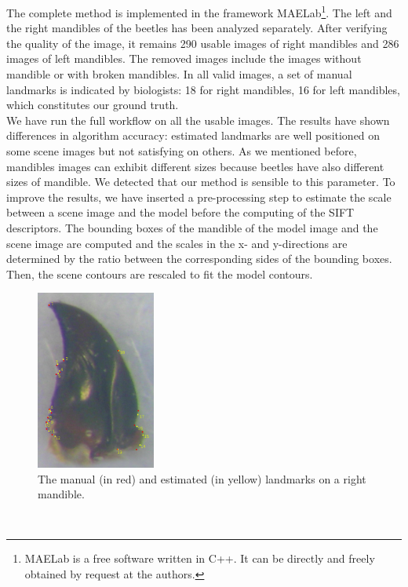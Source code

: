 \documentclass[twoside,twocolumn,10pt]{article}
\begin{document}
The complete method is implemented in the framework MAELab\footnote{MAELab
  is a free software written in C++. It can be directly and freely obtained by request
  at the authors.}. The left and the right mandibles of the beetles has been analyzed separately.
After verifying the quality of the image, it remains 290 usable images of right mandibles and 286 images of left mandibles.
The removed images include the images without mandible or with broken mandibles.
In all valid images, a set of manual landmarks is indicated by
biologists: 18 for right mandibles, 16 for left mandibles, which
constitutes our ground truth.
\\
We have run the full workflow on all the usable images.
The results have shown differences in algorithm accuracy: estimated
landmarks are well positioned on some scene images but not satisfying
on others. As we mentioned before, mandibles images can exhibit
different sizes because beetles have also different sizes of
mandible. We detected that our method is sensible to this parameter.
To improve the results, we have inserted a pre-processing step to
estimate the scale between a scene image and the model before the
computing of the SIFT descriptors. The bounding boxes of the mandible
of the model image and the scene image are computed and the scales in the x-
and y-directions are determined by the ratio between the corresponding
sides of the bounding boxes. Then, the scene contours are rescaled to fit the model contours. \\
\begin{figure}[h]
\centering
\includegraphics[width=0.35\textwidth]{./images/md_rs}
\caption{The manual (in red) and estimated (in yellow) landmarks on a right mandible.}
\label{figresult}
\end{figure}~\\
\end{document}
